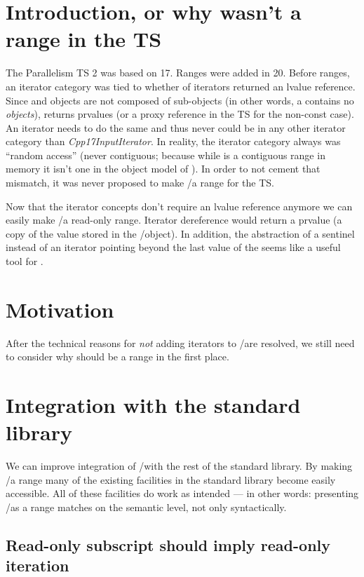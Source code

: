 \section{Introduction, or why  wasn't a range in the TS}

The Parallelism TS 2 was based on \CC{}17.
Ranges were added in \CC{}20.
Before ranges, an iterator category was tied to whether  of iterators returned an
lvalue reference.
Since \simd and \mask objects are not composed of sub-objects (in other words, a 
contains no  \emph{objects}),  returns prvalues (or a proxy reference
in the TS for the non-const case).
An iterator needs to do the same and thus never could be in any other iterator category than
\emph{Cpp17InputIterator}.
In reality, the iterator category always was “random access” (never contiguous; because while \simd
is a contiguous range in memory it isn't one in the object model of \CC{}).
In order to not cement that mismatch, it was never proposed to make \simd/\mask a range for the TS.

Now that the iterator concepts don't require an lvalue reference anymore we can easily make
\simd/\mask a read-only range.
Iterator dereference would return a prvalue (a copy of the value stored in the \simd/\mask object).
In addition, the abstraction of a sentinel instead of an iterator pointing beyond the last value of
the \simd seems like a useful tool for \simd.

\section{Motivation}

After the technical reasons for \emph{not} adding iterators to \simd/\mask are resolved, we still
need to consider why \simd should be a range in the first place.

\section{Integration with the standard library}

We can improve integration of \simd/\mask with the rest of the standard library.
By making \simd/\mask a range many of the existing facilities in the standard library become
easily accessible.
All of these facilities do work as intended — in other words: presenting \simd/\mask as a range
matches on the semantic level, not only syntactically.

\subsection{Read-only subscript should imply read-only iteration}

